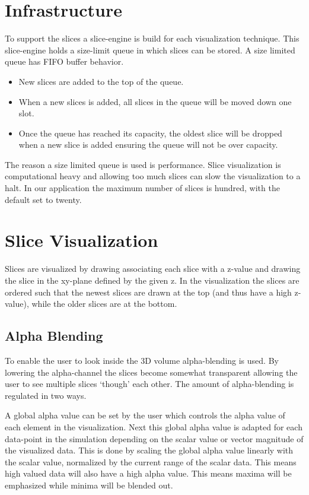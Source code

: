 \section{Infrastructure} %
\label{sec:infrastructure}
To support the slices a slice-engine is build for each visualization technique. This slice-engine holds a size-limit queue in which slices can be stored. A size limited queue has FIFO buffer behavior.
\begin{itemize}
 	\item New slices are added to the top of the queue.
 	\item When a new slices is added, all slices in the queue will be moved down one slot. 
 	\item Once the queue has reached its capacity, the oldest slice will be dropped when a new slice is added ensuring the queue will not be over capacity.
 \end{itemize}
 The reason a size limited queue is used is performance. Slice visualization is computational heavy and allowing too much slices can slow the visualization to a halt. In our application the maximum number of slices is hundred, with the default set to twenty.

\section{Slice Visualization} %
\label{sec:slice_visualization}
Slices are visualized by drawing associating each slice with a z-value and drawing the slice in the xy-plane defined by the given z. In the visualization the slices are ordered such that the newest slices are drawn at the top (and thus have a high z-value), while the older slices are at the bottom. 


\subsection{Alpha Blending} %
\label{sub:alpha_blending}
To enable the user to look inside the 3D volume alpha-blending is used. By lowering the alpha-channel the slices become somewhat transparent allowing the user to see multiple slices `though' each other. The amount of alpha-blending is regulated in two ways. 

A global alpha value can be set by the user which controls the alpha value of each element in the visualization. Next this global alpha value is adapted for each data-point in the simulation depending on the scalar value or vector magnitude of the visualized data. This is done by scaling the global alpha value linearly with the scalar value, normalized by the current range of the scalar data. This means high valued data will also have a high alpha value. This means maxima will be emphasized while minima will be blended out.

